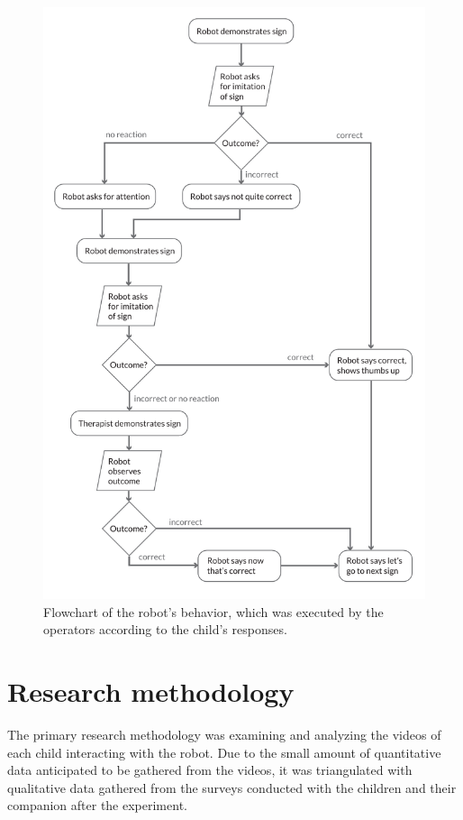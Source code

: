 \begin{figure}
\centering
  \includegraphics[width=\linewidth]{images/behavior_flowchart.pdf}
  \caption{Flowchart of the robot's behavior, which was executed by the operators according to the child's responses.}
  \label{fig:flowchart}
\end{figure}



\section{Research methodology}

The primary research methodology was examining and analyzing the videos of each child interacting with the robot. Due to the small amount of quantitative data anticipated to be gathered from the videos, it was triangulated with qualitative data gathered from the surveys conducted with the children and their companion after the experiment.

